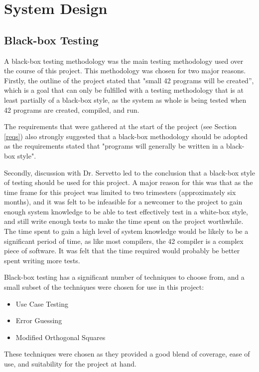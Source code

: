 \section{System Design}

\subsection{Black-box Testing \label{bbtest}}

A black-box testing methodology was the main testing methodology used over the course of this project. This methodology was chosen for two major reasons. Firstly, the outline of the project stated that  "small 42 programs will be created'', which is a goal that can only be fulfilled with a testing methodology that is at least partially of a black-box style, as the system as whole is being tested when 42 programs are created, compiled, and run.

The requirements that were gathered at the start of the project (see Section \ref{reqs}) also strongly suggested that a black-box methodology should be adopted as the requirements stated that "programs will generally be written in a black-box style".

Secondly, discussion with Dr. Servetto led to the conclusion that a black-box style of testing should be used for this project. A major reason for this was that as the time frame for this project was limited to two trimesters (approximately six months), and it was felt to be infeasible for a newcomer to the project to gain enough system knowledge to be able to test effectively test in a white-box style, and still write enough tests to make the time spent on the project worthwhile. The time spent to gain a high level of system knowledge would be likely to be a significant period of time, as like most compilers, the 42 compiler is a complex piece of software. It was felt that the time required would probably be better spent writing more tests.

Black-box testing has a significant number of techniques to choose from, and a small subset of the techniques were chosen for use in this project:

\begin{itemize} 
	\item{Use Case Testing}
	\item{Error Guessing}
	\item{Modified Orthogonal Squares}
\end{itemize}

These techniques were chosen as they provided a good blend of coverage, ease of use, and suitability for the project at hand. 

